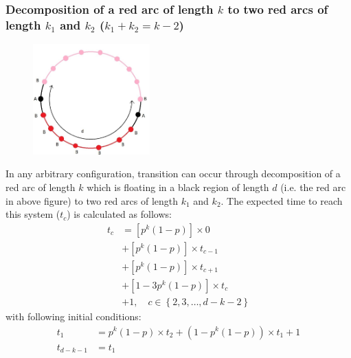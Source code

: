 \documentclass[]{book}
\theoremstyle{definition}
\begin{document}
\subsubsection{Decomposition of a red arc of length $k$ to two red arcs of length $k_1$ and $k_2$ ($k_1 + k_2 = k - 2$)}
\begin{figure}[H]
    \centering\includegraphics[width=0.4\textwidth]{figures/arc decomposition.jpg}
    \caption{}
\end{figure}
In any arbitrary configuration, transition can occur through decomposition of a red arc of length $k$ which is floating in a black region of length $d$ (i.e. the red arc in above figure) to two red arcs of length $k_1$ and $k_2$. The expected time to reach this system ($t_c$) is calculated as follows:
\begin{equation}
\begin{split}
    t_c &= \left[ p^k\left( 1-p \right) \right] \times 0 \\
    &+ \left[ p^k\left( 1-p \right) \right] \times t_{c-1} \\
    &+ \left[ p^k\left( 1-p \right) \right] \times t_{c+1} \\
    &+ \left[1 - 3p^k\left( 1-p \right) \right] \times t_c \\
    &+ 1, \quad c \in \left\{2, 3, \hdots, d-k-2 \right\}
\end{split}
\end{equation}
with following initial conditions:
\begin{equation}
\begin{split}
    t_1 &= p^k\left( 1-p \right) \times t_2 + \left( 1-p^k\left( 1-p \right) \right) \times t_1 + 1 \\
    t_{d-k-1} &= t_1
\end{split}
\end{equation}
\end{document}
